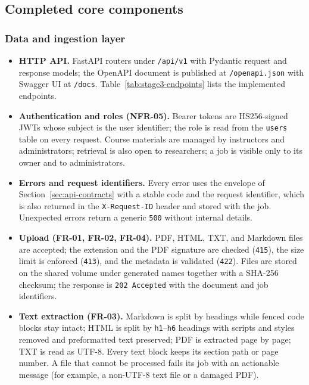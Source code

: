 \documentclass[12pt,a4paper]{article}
\begin{document}
\subsection{Completed core components}
\label{sec:stage3-components}

\subsubsection*{Data and ingestion layer}

\begin{itemize}
    \item \textbf{HTTP API.} FastAPI routers under \texttt{/api/v1}
    with Pydantic request and response models; the OpenAPI document
    is published at \texttt{/openapi.json} with Swagger UI at
    \texttt{/docs}. Table~\ref{tab:stage3-endpoints} lists the
    implemented endpoints.

    \item \textbf{Authentication and roles (NFR-05).} Bearer tokens are
    HS256-signed JWTs whose subject is the user identifier; the role is
    read from the \texttt{users} table on every request. Course
    materials are managed by instructors and administrators; retrieval
    is also open to researchers; a job is visible only to its owner and
    to administrators.

    \item \textbf{Errors and request identifiers.} Every error uses the
    envelope of Section~\ref{sec:api-contracts} with a stable code and
    the request identifier, which is also returned in the
    \texttt{X-Request-ID} header and stored with the job. Unexpected
    errors return a generic \texttt{500} without internal details.

    \item \textbf{Upload (FR-01, FR-02, FR-04).} PDF, HTML, TXT, and
    Markdown files are accepted; the extension and the PDF signature
    are checked (\texttt{415}), the size limit is enforced
    (\texttt{413}), and the metadata is validated (\texttt{422}). Files
    are stored on the shared volume under generated names together with
    a SHA-256 checksum; the response is \texttt{202 Accepted} with the
    document and job identifiers.

    \item \textbf{Text extraction (FR-03).} Markdown is split by
    headings while fenced code blocks stay intact; HTML is split by
    \texttt{h1}--\texttt{h6} headings with scripts and styles removed
    and preformatted text preserved; PDF is extracted page by page; TXT
    is read as UTF-8. Every text block keeps its section path or page
    number. A file that cannot be processed fails its job with an
    actionable message (for example, a non-UTF-8 text file or a damaged
    PDF).


\end{itemize}
\end{document}
